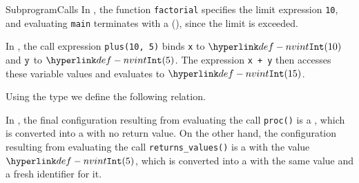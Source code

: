 \begin{SemanticsRuleList}{SubprogramCalls}
In , the function \verb|factorial| specifies the limit expression \verb|10|,
and evaluating \verb|main| terminates with a \dynamicerrorterm{} (\LimitExceeded), since the limit is exceeded.








In , the call expression \verb|plus(10, 5)| binds \verb|x| to $\nvint(10)$
and $\verb|y|$ to $\nvint(5)$. The expression \verb|x + y| then accesses
these variable values and evaluates to $\nvint(15)$.



Using the type  we define the following relation.

In ,
the final configuration resulting from evaluating the call \verb|proc()|
is a \Prosecontinuingconfiguration{}, which is converted into
a \Prosenormalconfiguration{} with no return value.
On the other hand, the configuration resulting from evaluating the
call \verb|returns_values()| is a \Prosereturningconfiguration{} with the value
$\nvint(5)$, which is converted into a \Prosenormalconfiguration{}
with the same value and a fresh identifier for it.




\end{SemanticsRuleList}

